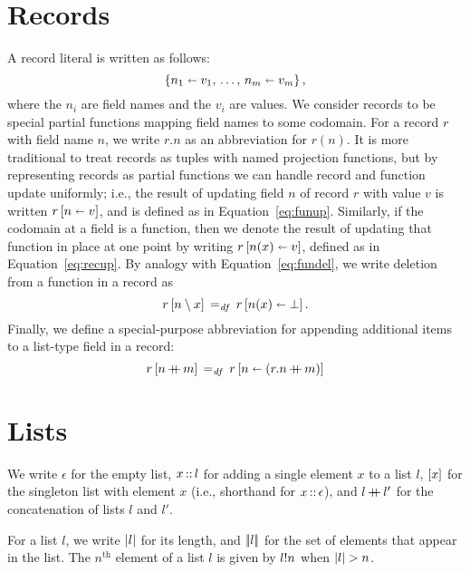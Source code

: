 \documentclass[11pt]{report}
\begin{document}

\section{Records} %
\label{sec:records}

A record literal is written as follows: \[ \reclit{\ptup{n_1}{v_1},\,\ldots,\, \ptup{n_m}{v_m}},\] where the $n_i$ are field names and the $v_i$ are values. We consider records to be special partial functions mapping field names to some codomain. For a record $r$ with field name $n$, we write $r.n$ as an abbreviation for $r(n)$. It is more traditional to treat records as tuples with named projection functions, but by representing records as partial functions we can handle record and function update uniformly; i.e., the result of updating field $n$ of record $r$ with value $v$ is written $\recup{r}{n}{v}$, and is defined as in Equation~\ref{eq:funup}. Similarly, if the codomain at a field is a function, then we denote the result of updating that function in place at one point by writing $\recup{r}{n(x)}{v}$, defined as in Equation~\ref{eq:recup}. By analogy with Equation~\ref{eq:fundel}, we write deletion from a function in a record as \begin{equation}
	\label{eq:recdel}
	\funup{r}{n \setminus x} \eqdef \funup{r}{\ptup{n(x)}{\bot}}.
\end{equation} Finally, we define a special-purpose abbreviation for appending additional items to a list-type field in a record: \begin{equation}
	\label{eq:ptapp}
	\funup{r}{\ptapp{n}{m}} \eqdef \funup{r}{\ptup{n}{(r.n \lapp m)}} 
\end{equation}


\section{Lists} %
\label{sec:lists}

We write $\epsilon$ for the empty list, $x \lcons l$ for adding a single element $x$ to a list $l$, $\lsingle{x}$ for the singleton list with element $x$ (i.e., shorthand for $x \lcons \epsilon$), and $l \lapp l'$ for the concatenation of lists $l$ and $l'$. 

For a list $l$, we write $\llen{l}$ for its length, and $\elems{l}$ for the set of elements that appear in the list. The $n^{\text{th}}$ element of a list $l$ is given by $\nth{n}{l}$ when $\llen{l} > n$. 
\end{document}
